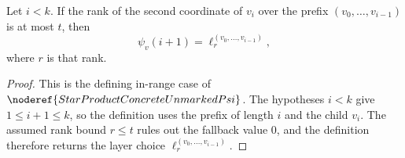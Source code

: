 \begin{lemma}
Let \(i<k\).  If the rank of the second coordinate of \(v_i\) over the prefix
\((v_0,\ldots,v_{i-1})\) is at most \(t\), then
\[
  \psi_v(i+1)=\ell_{r}^{(v_0,\ldots,v_{i-1})},
\]
where \(r\) is that rank.
\end{lemma}
\begin{proof}
This is the defining in-range case of
\(\noderef{StarProductConcreteUnmarkedPsi}\).  The hypotheses \(i<k\) give
\(1\le i+1\le k\), so the definition uses the prefix of length \(i\) and the
child \(v_i\).  The assumed rank bound \(r\le t\) rules out the fallback value
\(0\), and the definition therefore returns the layer choice
\(\ell_r^{(v_0,\ldots,v_{i-1})}\).
\end{proof}
